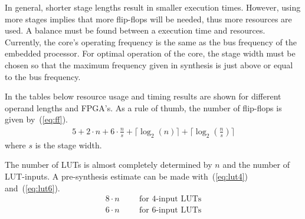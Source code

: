 In general, shorter stage lengths result in smaller execution times. However, using more stages implies that more
flip-flops will be needed, thus more resources are used. A balance must be found between a execution time and resources.
Currently, the core's operating frequency is the same as the bus frequency of the embedded processor. For optimal
operation of the core, the stage width must be chosen so that the maximum frequency given in synthesis is just above or
equal to the bus frequency.

In the tables below resource usage and timing results are shown for different operand lengths and FPGA's. As a rule of thumb, the number of flip-flops is given by~(\ref{eq:ff}).
\begin{align}\label{eq:ff}
5+2\cdot n+6\cdot\frac{n}{s}+\lceil\log_{2}(n)\rceil+\lceil\log_{2}(\frac{n}{s})\rceil
\end{align}
where $s$ is the stage width.

The number of LUTs is almost completely determined by $n$ and the number of LUT-inputs. A pre-synthesis estimate can be made with~(\ref{eq:lut4}) and~(\ref{eq:lut6}).
\begin{align}
8\cdot n \hspace{1cm}\text{for 4-input LUTs} \label{eq:lut4}\\
6\cdot n \hspace{1cm}\text{for 6-input LUTs} \label{eq:lut6}
\end{align}
\newline


